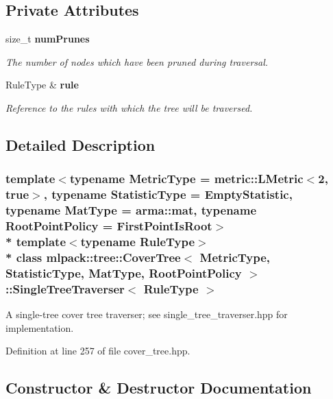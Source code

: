 \subsection*{Private Attributes}
\begin{DoxyCompactItemize}
\item 
size\+\_\+t {\bf num\+Prunes}
\begin{DoxyCompactList}\small\item\em The number of nodes which have been pruned during traversal. \end{DoxyCompactList}\item 
Rule\+Type \& {\bf rule}
\begin{DoxyCompactList}\small\item\em Reference to the rules with which the tree will be traversed. \end{DoxyCompactList}\end{DoxyCompactItemize}


\subsection{Detailed Description}
\subsubsection*{template$<$typename Metric\+Type = metric\+::\+L\+Metric$<$2, true$>$, typename Statistic\+Type = Empty\+Statistic, typename Mat\+Type = arma\+::mat, typename Root\+Point\+Policy = First\+Point\+Is\+Root$>$\\*
template$<$typename Rule\+Type$>$\\*
class mlpack\+::tree\+::\+Cover\+Tree$<$ Metric\+Type, Statistic\+Type, Mat\+Type, Root\+Point\+Policy $>$\+::\+Single\+Tree\+Traverser$<$ Rule\+Type $>$}

A single-\/tree cover tree traverser; see single\+\_\+tree\+\_\+traverser.\+hpp for implementation. 



Definition at line 257 of file cover\+\_\+tree.\+hpp.



\subsection{Constructor \& Destructor Documentation}
